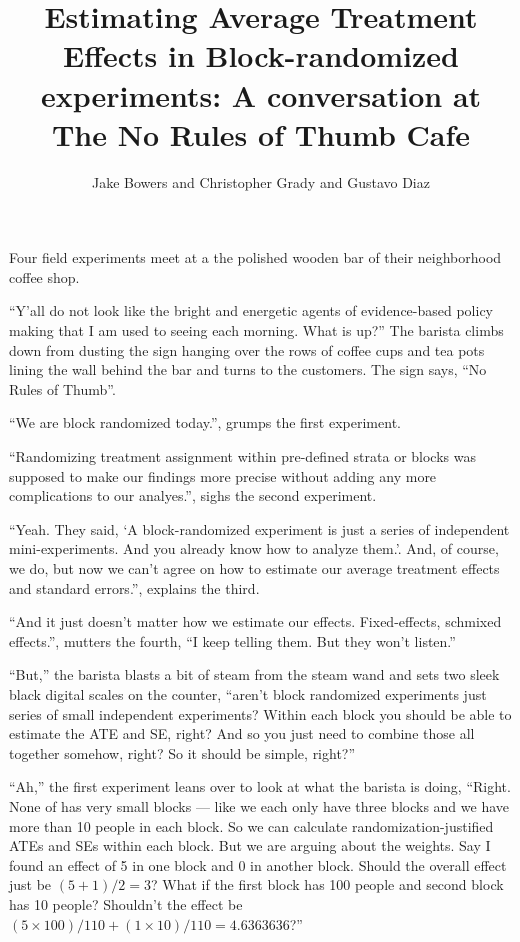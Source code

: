 \documentclass[
]{article}
\title{Estimating Average Treatment Effects in Block-randomized experiments: A conversation at The No Rules of Thumb Cafe}
\author{Jake Bowers and Christopher Grady and Gustavo Diaz}
\date{}
\begin{document}
\maketitle

{
\setcounter{tocdepth}{2}
\tableofcontents
}
Four field experiments meet at a the polished wooden bar of their neighborhood coffee shop.

``Y'all do not look like the bright and energetic agents of evidence-based
policy making that I am used to seeing each morning. What is up?'' The barista
climbs down from dusting the sign hanging over the rows of coffee cups and tea
pots lining the wall behind the bar and turns to the customers. The sign says,
``No Rules of Thumb''.

``We are block randomized today.'', grumps the first experiment.

``Randomizing treatment assignment within pre-defined strata or blocks was
supposed to make our findings more precise without adding any more
complications to our analyes.'', sighs the second experiment.

``Yeah. They said, `A block-randomized experiment is just a series of
independent mini-experiments. And you already know how to analyze them.'. And,
of course, we do, but now we can't agree on how to estimate our average
treatment effects and standard errors.'', explains the third.

``And it just doesn't matter how we estimate our effects. Fixed-effects,
schmixed effects.'', mutters the fourth, ``I keep telling them. But they won't
listen.''

``But,'' the barista blasts a bit of steam from the steam wand and sets two sleek
black digital scales on the counter, ``aren't block randomized experiments just
series of small independent experiments? Within each block you should be able
to estimate the ATE and SE, right? And so you just need to combine those all
together somehow, right? So it should be simple, right?''

``Ah,'' the first experiment leans over to look at what the barista is doing, ``Right. None of has very small blocks --- like we each only have three blocks and we have more than 10 people in each block. So we can calculate randomization-justified ATEs and SEs within each block. But we are arguing about the weights. Say I found an effect of 5 in one block and 0 in another block. Should the overall effect just be \((5+1)/2=3\)? What if the first block has 100 people and second block has 10 people? Shouldn't the effect be \((5 \times 100)/110 + (1 \times 10)/110 = 4.6363636\)?''
\end{document}
